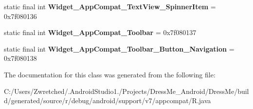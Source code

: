 \begin{DoxyCompactItemize}
\item 
\hypertarget{classandroid_1_1support_1_1v7_1_1appcompat_1_1_r_1_1style_ae78217806d80f6d12c6be69d442ec4aa}{}static final int {\bfseries Widget\+\_\+\+App\+Compat\+\_\+\+Text\+View\+\_\+\+Spinner\+Item} = 0x7f080136\label{classandroid_1_1support_1_1v7_1_1appcompat_1_1_r_1_1style_ae78217806d80f6d12c6be69d442ec4aa}

\item 
\hypertarget{classandroid_1_1support_1_1v7_1_1appcompat_1_1_r_1_1style_a09461e6cdfb963d2621f721c73f9c64d}{}static final int {\bfseries Widget\+\_\+\+App\+Compat\+\_\+\+Toolbar} = 0x7f080137\label{classandroid_1_1support_1_1v7_1_1appcompat_1_1_r_1_1style_a09461e6cdfb963d2621f721c73f9c64d}

\item 
\hypertarget{classandroid_1_1support_1_1v7_1_1appcompat_1_1_r_1_1style_ab210292245646fce123ac455b8fa3870}{}static final int {\bfseries Widget\+\_\+\+App\+Compat\+\_\+\+Toolbar\+\_\+\+Button\+\_\+\+Navigation} = 0x7f080138\label{classandroid_1_1support_1_1v7_1_1appcompat_1_1_r_1_1style_ab210292245646fce123ac455b8fa3870}

\end{DoxyCompactItemize}


The documentation for this class was generated from the following file\+:\begin{DoxyCompactItemize}
\item 
C\+:/\+Users/\+Zwretched/.\+Android\+Studio1./\+Projects/\+Dress\+Me\+\_\+\+Android/\+Dress\+Me/build/generated/source/r/debug/android/support/v7/appcompat/R.\+java\end{DoxyCompactItemize}
